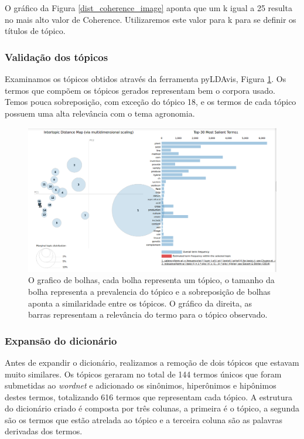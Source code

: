 O gráfico da Figura \ref{dist_coherence_image} aponta que um k igual a 25 resulta no mais alto valor de Coherence. Utilizaremos este valor para k para se definir os títulos de tópico.

\subsubsection{Validação dos tópicos}

Examinamos os tópicos obtidos através da ferramenta pyLDAvis, Figura \ref{pyLDAvis_image}. Os termos que compõem os tópicos gerados  representam bem o corpora usado. Temos pouca sobreposição, com exceção do tópico 18, e os termos de cada tópico possuem uma alta relevância com o tema agronomia.  

\begin{figure}[ht!]
	\centering
	\includegraphics[scale=0.4]{imagens/construcao_dicionario.png}
	\caption{O grafico de bolhas, cada bolha representa um tópico, o tamanho da bolha representa a prevalencia do tópico e a sobreposição de bolhas aponta a similaridade entre os tópicos. O gráfico da direita, as barras representam a relevância do termo para o tópico observado.
			 \label{pyLDAvis_image}}
\end{figure}

\subsubsection{Expansão do dicionário}

Antes de expandir o dicionário, realizamos a remoção de dois tópicos que estavam muito similares. Os tópicos geraram no total de 144 termos únicos que foram submetidas ao \textit{wordnet} e adicionado os sinônimos, hiperônimos e hipônimos destes termos, totalizando 616 termos que representam cada tópico. A estrutura do dicionário criado é composta por três colunas, a primeira é o tópico, a segunda são os termos que estão atrelada ao tópico e a terceira coluna são as palavras derivadas dos termos.

